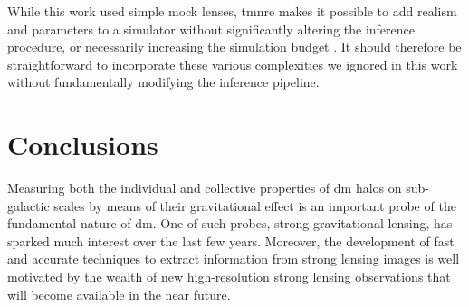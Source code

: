 While this work used simple mock lenses, \gls*{tmnre} makes it possible to add realism and parameters to a simulator without significantly altering the inference procedure, or necessarily increasing the simulation budget \citep{Cole:2021gwr}. It should therefore be straightforward to incorporate these various complexities we ignored in this work without fundamentally modifying the inference pipeline. 



\section{Conclusions}\label{sec:sl-conclusions}

Measuring both the individual and collective properties of \gls*{dm} halos on sub-galactic scales by means of their gravitational effect is an important probe of the fundamental nature of \gls*{dm}. One of such probes, strong gravitational lensing, has sparked much interest over the last few years. Moreover, the development of fast and accurate techniques to extract information from strong lensing images is well motivated by the wealth of new high-resolution strong lensing observations that will become available in the near future.

